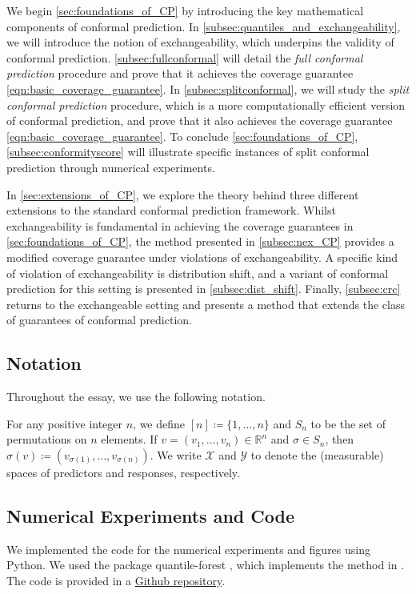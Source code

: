 \documentclass[11pt, titlepage]{article} %
\numberwithin{equation}{section}
\theoremstyle{definition}
\numberwithin{theorem}{section}
\numberwithin{lemma}{section}
\numberwithin{corollary}{section}
\numberwithin{proposition}{section}
\numberwithin{definition}{section}
\numberwithin{remark}{section}
\begin{document}
\noindent
We begin \cref{sec:foundations_of_CP} by introducing the key mathematical components of conformal prediction. In \cref{subsec:quantiles_and_exchangeability}, we will introduce the notion of exchangeability, which underpins the validity of conformal prediction. \cref{subsec:fullconformal} will detail the \textit{full conformal prediction} procedure and prove that it achieves the coverage guarantee \eqref{eqn:basic_coverage_guarantee}. In \cref{subsec:splitconformal}, we will study the \textit{split conformal prediction} procedure, which is a more computationally efficient version of conformal prediction, and prove that it also achieves the coverage guarantee \eqref{eqn:basic_coverage_guarantee}. To conclude \cref{sec:foundations_of_CP}, \cref{subsec:conformityscore} will illustrate specific instances of split conformal prediction through numerical experiments. \vskip5pt

\noindent
In \cref{sec:extensions_of_CP}, we explore the theory behind three different extensions to the standard conformal prediction framework. Whilst exchangeability is fundamental in achieving the coverage guarantees in \cref{sec:foundations_of_CP}, the method presented in \cref{subsec:nex_CP} provides a modified coverage guarantee under violations of exchangeability. A specific kind of violation of exchangeability is distribution shift, and a variant of conformal prediction for this setting is presented in \cref{subsec:dist_shift}. Finally, \cref{subsec:crc} returns to the exchangeable setting and presents a method that extends the class of guarantees of conformal prediction.

\subsection{Notation}
\label{subsec:notation}

Throughout the essay, we use the following notation.  \vskip5pt

\noindent
For any positive integer \(n\), we define \([n] \coloneqq \{1, \ldots, n\}\) and \(S_n\) to be the set of permutations on \(n\) elements. If \(v = (v_1, \ldots, v_n) \in \mathbb{R}^n\) and \(\sigma \in S_n\), then \(\sigma(v) \coloneqq (v_{\sigma(1)}, \ldots, v_{\sigma(n)}).\) We write \(\mathcal{X}\) and \(\mathcal{Y}\) to denote the (measurable) spaces of predictors and responses, respectively.

\subsection{Numerical Experiments and Code}
We implemented the code for the numerical experiments and figures using Python. We used the package quantile-forest \cite{Johnson2024}, which implements the method in \cite{meinshausen2006quantile}. The code is provided in a \href{https://github.com/shreyaspandit/Part-III-Essay}{Github repository}.
\end{document}
